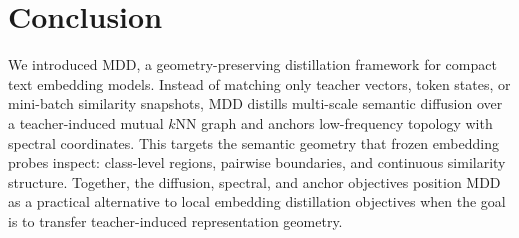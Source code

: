 \section{Conclusion}

We introduced MDD, a geometry-preserving distillation framework for compact text embedding models. Instead of matching only teacher vectors, token states, or mini-batch similarity snapshots, MDD distills multi-scale semantic diffusion over a teacher-induced mutual $k$NN graph and anchors low-frequency topology with spectral coordinates. This targets the semantic geometry that frozen embedding probes inspect: class-level regions, pairwise boundaries, and continuous similarity structure. Together, the diffusion, spectral, and anchor objectives position MDD as a practical alternative to local embedding distillation objectives when the goal is to transfer teacher-induced representation geometry.
